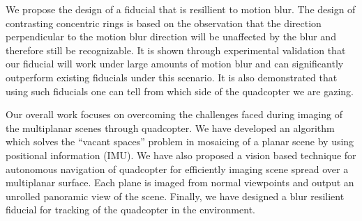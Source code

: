 We propose the design of a fiducial that is resillient to motion blur. The
design of contrasting concentric rings is based on the observation that the
direction perpendicular to the motion blur direction will be unaffected by the
blur and therefore still be recognizable. It is shown through experimental
validation that our fiducial will work under large amounts of motion blur and
can significantly outperform existing fiducials under this scenario. It is also
demonstrated that using such fiducials one can tell from which side of the
quadcopter we are gazing.

Our overall work focuses on overcoming the challenges faced during imaging of
the multiplanar scenes through quadcopter. We have developed an algorithm which
solves the ``vacant spaces'' problem in mosaicing of a planar scene by using
positional information (IMU). We have also proposed a vision based technique for
autonomous navigation of quadcopter for efficiently imaging scene spread over a
multiplanar surface. Each plane is imaged from normal viewpoints and output an
unrolled panoramic view of the scene. Finally, we have designed a blur resilient
fiducial for tracking of the quadcopter in the environment.
